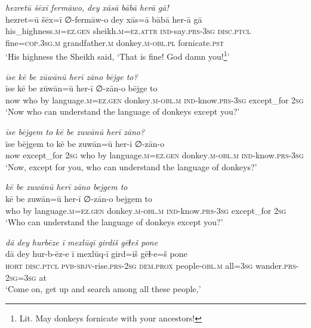 \ea \label{HB.85}
\textit{hezretū šēxī fermāwo, dey xāsā bābā herā gā!} \\ 
\gll hezret=ū šēx=ī ∅-fermāw-o dey xās=ā bābā her-ā gā \\ 
 his\_highness\textsc{.m}\textsc{=ez}\textsc{.gen} sheikh\textsc{.m}\textsc{=ez}.\textsc{attr} \textsc{ind-}say\textsc{.prs}\textsc{-3sg} \textsc{disc.ptcl} fine\textsc{=cop}\textsc{.3sg}\textsc{.m} grandfather\textsc{.m} donkey\textsc{.m}\textsc{-obl}\textsc{.pl} fornicate\textsc{.pst} \\ 
\glt `His highness the Sheikh said, ‘That is fine! God damn you!\footnote{Lit. May donkeys fornicate with your ancestors!}'
\z 
 
\ea \label{HB.86}
\textit{īse kē be zūwānū herī zāno bējge to?} \\ 
\gll īse kē be zūwān=ū her-ī ∅-zān-o bējge to \\ 
 now who by language\textsc{.m}\textsc{=ez}\textsc{.gen} donkey\textsc{.m}\textsc{-obl}\textsc{.m} \textsc{ind-}know\textsc{.prs}\textsc{-3sg} except\_for \textsc{2sg} \\ 
\glt `Now who can understand the language of donkeys except you?'
\z 
 
\ea \label{HB.87}
\textit{īse bējgem to kē be zuwānū herī zāno?} \\ 
\gll īse bējgem to kē be zuwān=ū her-ī ∅-zān-o \\ 
 now except\_for \textsc{2sg} who by language\textsc{.m}\textsc{=ez}\textsc{.gen} donkey\textsc{.m}\textsc{-obl}\textsc{.m} \textsc{ind-}know\textsc{.prs}\textsc{-3sg} \\ 
\glt `Now, except for you, who can understand the language of donkeys?'
\z 
 
\ea \label{HB.88}
\textit{kē be zuwānū herī zāno bejgem to} \\ 
\gll kē be zuwān=ū her-ī ∅-zān-o bejgem to \\ 
 who by language\textsc{.m}\textsc{=ez}\textsc{.gen} donkey\textsc{.m}\textsc{-obl}\textsc{.m} \textsc{ind-}know\textsc{.prs}\textsc{-3sg} except\_for \textsc{2sg} \\ 
\glt `Who can understand the language of donkeys except you?'
\z 
 
\ea \label{HB.90}
\textit{dā dey hurbēze ī mexlūqī girdiš gēɫeš pone} \\ 
\gll dā dey hur-b-ēz-e ī mexlūq-ī gird=iš gēɫ-e=š pone \\ 
 \textsc{hort} \textsc{disc.ptcl} \textsc{pvb-}\textsc{sbjv-}rise\textsc{.prs}-\textsc{2sg} \textsc{dem.prox} people\textsc{-obl}\textsc{.m} all\textsc{=3sg} wander\textsc{.prs}-\textsc{2sg}\textsc{=3sg} at \\ 
\glt `Come on, get up and search among all these people,'
\z 
 
